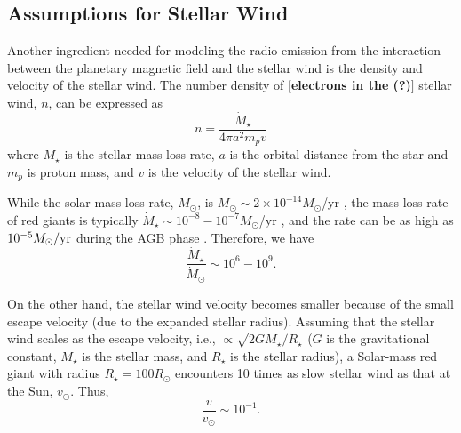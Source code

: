 \documentclass{emulateapj}
\def\memoTM#1{\color{DarkGreen}$[${\bf #1}$]$ \color{black}}
\begin{document}




\subsection{Assumptions for Stellar Wind}
\label{ss:stellarwind}

Another ingredient needed for modeling the radio emission from the interaction between the planetary magnetic field and the stellar wind is the density and velocity of the stellar wind. 
The number density of \memoTM{electrons in the (?)} stellar wind, $n$, can be expressed as
\begin{equation}
n = \frac{\dot M_\star}{4\pi a^2 m_p v}
\label{eq:n}
\end{equation}
where $\dot M_\star$ is the stellar mass loss rate, $a$ is the orbital distance from the star and $m_p$ is proton mass, and $v$ is the velocity of the stellar wind. 

While the solar mass loss rate, $\dot M_\odot$, is $\dot M_\odot \sim 2\times 10^{-14} M_{\odot}$/yr \citep[e.g.,][]{hundhausen1997}, the mass loss rate of red giants is typically $\dot M_\star \sim 10^{-8}-10^{-7} M_{\odot}$/yr 
\citep{reimers1975}
, and the rate can be as high as $10^{-5} M_\odot{\rm /yr}$ during the AGB phase
\citep{schild1989, vassiliadis1993, schoier2001, vanloon2005}.
Therefore, we have
\begin{equation}
\frac{\dot M_\star}{\dot M_{\odot}} \sim 10^6 - 10^9 . \label{eq:scale_Mdot}
\end{equation}

On the other hand, the stellar wind velocity becomes smaller because of the small escape velocity (due to the expanded stellar radius).
Assuming that the stellar wind scales as the escape velocity, i.e., $\propto \sqrt{2GM_{\star}/R_{\star}}$ ($G$ is the gravitational constant, $M_{\star}$ is the stellar mass, and $R_{\star}$ is the stellar radius), a Solar-mass red giant with radius $R_{\star}=100R_{\odot}$ encounters 10 times as slow stellar wind as that at the Sun, $v_{\odot}$. Thus, 
\begin{equation}
\frac{v}{v_{\odot}} \sim 10^{-1} . \label{eq:scale_v}
\end{equation}
\end{document}

